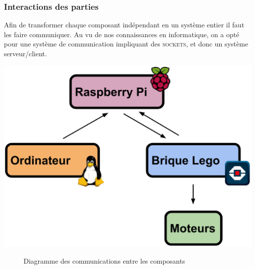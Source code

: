 \documentclass[twoside,twocolumn, 16pt]{article}
\begin{document}
\subsubsection{Interactions des parties}
Afin de transformer chaque composant indépendant en un système entier il faut les faire communiquer. Au vu de nos connaissances en informatique, on a opté pour une système de communication impliquant des \textsc{sockets}, et donc un système serveur/client.
\begin{center}
\includegraphics [scale = 0.21] {architecture.eps}
\begin{figure}[!h]
\caption{Diagramme des communications entre les composants}
\end{figure}
\end{center}	
\vspace{-1cm}
\end{document}
